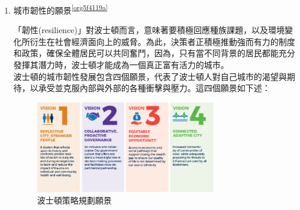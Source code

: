 \documentclass[a4paper,12pt]{article}
\begin{document}
\begin{enumerate}
\begin{enumerate}
\item 城市韌性的願景\textsuperscript{\ref{org5f4119a}}
\label{sec:orgd774ac9}

「韌性(resilience)」對波士頓而言，意味著要積極回應種族課題，以及環境變化所衍生在社會經濟面向上的威脅。為此，決策者正積極推動強而有力的制度和政策，確保全體居民可以共同奮鬥，因為，只有當不同背景的居民都能充分發揮其潛力時，波士頓才能成為一個真正富有活力的城市。\\

波士頓的城市韌性發展包含四個願景，代表了波士頓人對自己城市的渴望與期待，以承受並克服內部與外部的各種衝擊與壓力。這四個願景如下述：\\
\begin{figure}[htbp]
\centering
\includegraphics[width=300]{images/49132357_938728969849329_1147817099184308224_n.png}
\caption{\label{fig:FigName}波士頓策略規劃願景}
\end{figure}


\end{enumerate}
\end{enumerate}
\end{document}
